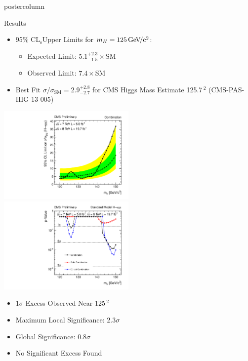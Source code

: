 \documentclass[final,hyperref={pdfpagelabels=false}]{beamer}
\newcommand{\GeVcc}{\,\text{Ge\kern -0.1em  V\!/c}\ensuremath{\mathrm{^2}}}
\newcommand{\cls}{CL$\mathrm{_s}$}
\begin{document}
\begin{frame}
\begin{columns}
\begin{column}{.49\textwidth}
\begin{beamercolorbox}[center,wd=\textwidth]{postercolumn}
\begin{minipage}[T]{.95\textwidth}
{\begin{block}{Results}
              \begin{itemize}
                \item 95\% \cls Upper Limits for $m_H = 125 \GeVcc{}$:
                \begin{itemize}
                  \item Expected Limit: $5.1^{+2.3}_{-1.5}\times$SM
                  \item Observed Limit: $7.4\times$SM
                \end{itemize}              
                \item Best Fit $\sigma/\sigma_{\mathrm{SM}}=2.9^{+2.8}_{-2.7}$ for CMS Higgs Mass Estimate 125.7\GeVcc{} (CMS-PAS-HIG-13-005)
              \end{itemize}              
              \begin{center}
                \includegraphics[width=0.5\textwidth]{plotsPublic/limits_annalysisA/pdf/CombSplitAll_7P8TeV.pdf}
                \includegraphics[width=0.5\textwidth]{plotsPublic/pValues_analysisA/pdf/pValues_Final7P8TeV.pdf}
              \end{center}
              \begin{itemize}
                \item $1\sigma$ Excess Observed Near 125\GeVcc{}
                \item Maximum Local Significance: $2.3\sigma$
                \item Global Significance: $0.8\sigma$
                \item No Significant Excess Found
              \end{itemize}

\end{block}}
\end{minipage}
\end{beamercolorbox}
\end{column}
\end{columns}
\end{frame}
\end{document}
